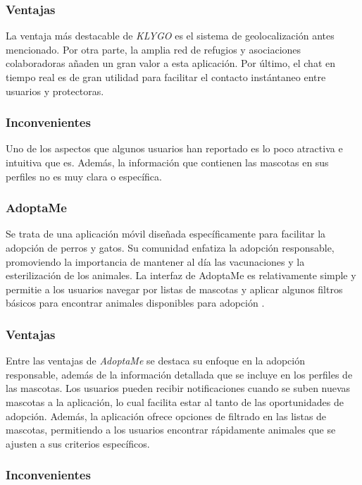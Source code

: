 \documentclass[a4paper, 12pt]{article}
\begin{document}
\subsubsection*{Ventajas}

La ventaja más destacable de \textit{KLYGO} es el sistema de geolocalización antes mencionado. Por otra parte, la amplia red de refugios y asociaciones colaboradoras añaden un gran valor a esta aplicación. Por último, el chat en tiempo real es de gran utilidad para facilitar el contacto instántaneo entre usuarios y protectoras.

\subsubsection*{Inconvenientes}

Uno de los aspectos que algunos usuarios han reportado es lo poco atractiva e intuitiva que es. Además, la información que contienen las mascotas en sus perfiles no es muy clara o específica.

\subsubsection*{AdoptaMe}

Se trata de una aplicación móvil diseñada específicamente para facilitar la adopción de perros y gatos. Su comunidad enfatiza la adopción responsable, promoviendo la importancia de mantener al día las vacunaciones y la esterilización de los animales. La interfaz de AdoptaMe es relativamente simple y permitie a los usuarios navegar por listas de mascotas y aplicar algunos filtros básicos para encontrar animales disponibles para adopción \cite{adoptame}.

\subsubsection*{Ventajas}

Entre las ventajas de \textit{AdoptaMe} se destaca su enfoque en la adopción responsable, además de la información detallada que se incluye en los perfiles de las mascotas. Los usuarios pueden recibir notificaciones cuando se suben nuevas mascotas a la aplicación, lo cual facilita estar al tanto de las oportunidades de adopción. Además, la aplicación ofrece opciones de filtrado en las listas de mascotas, permitiendo a los usuarios encontrar rápidamente animales que se ajusten a sus criterios específicos.

\subsubsection*{Inconvenientes}
\end{document}
